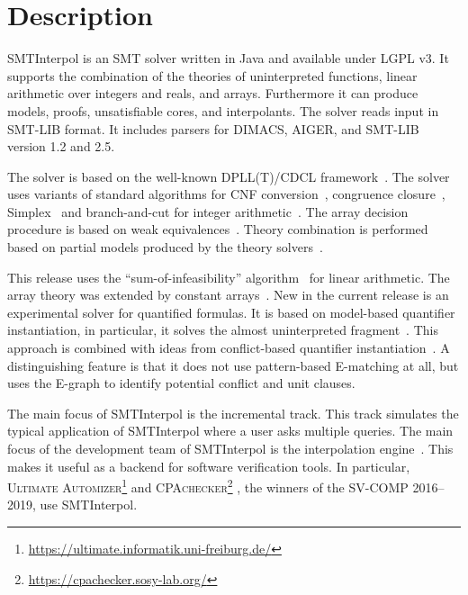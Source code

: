 \documentclass[a4paper]{easychair}
\title{\SI\\{\large Version\version}}
\author{Jochen Hoenicke \and Tanja Schindler}
\institute{
  University of Freiburg\\
  \email{\{hoenicke,schindle\}@informatik.uni-freiburg.de}\\[1ex]
  \today
}
\newcommand\SI{SMTInterpol\xspace}
\begin{document}
\maketitle
\section*{Description}
\SI is an SMT solver written in Java and available under LGPL v3.  It supports
the combination of the theories of uninterpreted functions,
linear arithmetic over integers and reals, and arrays.  Furthermore it can
produce models, proofs, unsatisfiable cores, and interpolants.  The solver
reads input in SMT-LIB format.  It includes parsers for DIMACS, AIGER, and
SMT-LIB version 1.2 and 2.5.

The solver is based on the well-known DPLL(T)/CDCL framework~\cite{DBLP:conf/cav/GanzingerHNOT04}.
The solver uses variants of standard algorithms for CNF
conversion~\cite{DBLP:journals/jsc/PlaistedG86}, congruence
closure~\cite{DBLP:conf/rta/NieuwenhuisO05}, Simplex~\cite{DBLP:conf/cav/DutertreM06} and
branch-and-cut for integer arithmetic~\cite{DBLP:conf/cav/ChristH15,DBLP:conf/cav/DilligDA09}.
The array decision procedure is based on weak equivalences~\cite{DBLP:conf/frocos/ChristH15}.
Theory combination is performed based on partial models produced by the theory
solvers~\cite{DBLP:journals/entcs/MouraB08}.

This release uses the ``sum-of-infeasibility'' algorithm~\cite{DBLP:conf/fmcad/KingBD13} for linear arithmetic.
The array theory was extended by constant arrays~\cite{DBLP:conf/vmcai/HoenickeS19}.
New in the current release is an experimental solver for quantified formulas.
It is based on model-based quantifier instantiation, in particular, it solves the almost uninterpreted fragment~\cite{DBLP:conf/cav/GeM09}.
This approach is combined with ideas from conflict-based quantifier instantiation~\cite{DBLP:conf/fmcad/ReynoldsTM14}.
A distinguishing feature is that it does not use pattern-based E-matching at all, but uses the E-graph to identify potential conflict and unit clauses.

The main focus of \SI is the incremental track.
This track simulates the typical
application of \SI where a user asks multiple queries.  The main focus
of the development team of \SI is the interpolation
engine~\cite{DBLP:journals/jar/ChristH16,DBLP:conf/cade/HoenickeS18}.
This makes it useful as a backend for software verification tools.  In particular,
\textsc{Ultimate Automizer}\footnote{\url{https://ultimate.informatik.uni-freiburg.de/}} %
and \textsc{CPAchecker}\footnote{\url{https://cpachecker.sosy-lab.org/}}%
, the winners of the SV-COMP 2016--2019, use \SI.
\end{document}
